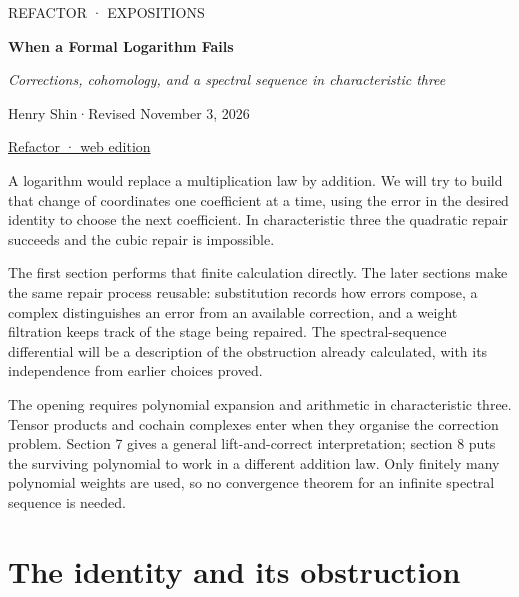 \documentclass[11pt,letterpaper]{article}
\begin{document}
\color{ink}
\thispagestyle{empty}
{\sffamily\small\textcolor{accent}{REFACTOR · EXPOSITIONS}\par}
\vspace{.6em}
{\LARGE\bfseries When a Formal Logarithm Fails\par}
\vspace{.4em}
{\large\itshape Corrections, cohomology, and a spectral sequence in characteristic three\par}
\vspace{.65em}
{Henry Shin\hspace{.6em}·\hspace{.6em}Revised November 3, 2026\par}
\vspace{.3em}
{\small\href{https://refactor.press/notes/when-a-formal-logarithm-fails.html}{Refactor · web edition}\par}
\vspace{.6em}

A logarithm would replace a multiplication law by addition. We will try to build that change of coordinates one coefficient at a time, using the error in the desired identity to choose the next coefficient. In characteristic three the quadratic repair succeeds and the cubic repair is impossible.

The first section performs that finite calculation directly. The later sections make the same repair process reusable: substitution records how errors compose, a complex distinguishes an error from an available correction, and a weight filtration keeps track of the stage being repaired. The spectral-sequence differential will be a description of the obstruction already calculated, with its independence from earlier choices proved.

The opening requires polynomial expansion and arithmetic in characteristic three. Tensor products and cochain complexes enter when they organise the correction problem. Section 7 gives a general lift-and-correct interpretation; section 8 puts the surviving polynomial to work in a different addition law. Only finitely many polynomial weights are used, so no convergence theorem for an infinite spectral sequence is needed.

\clearpage\thispagestyle{plain}\tableofcontents\clearpage
\section{The identity and its obstruction}\label{sec:identity-and-obstruction}\hypertarget{identity-and-obstruction}{}
\end{document}
